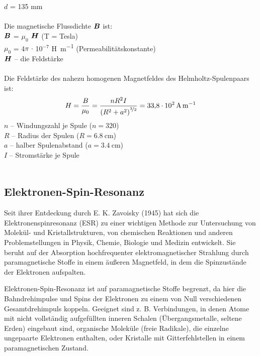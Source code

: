 \documentclass[ngerman]{scrartcl}
\begin{document}
\begin{minipage}[t]{0.6\linewidth}
    \vspace{1cm}
    $d$ = 135 mm\\ \\
    Die magnetische Flussdichte $\vb*{B}$ ist:\\
    $\vb*{B}$ = $\mu_0$ $\vb*{H}$ (T = Tesla)\\
    $\mu_0$ = 4$\pi$ $\cdot$ 10$^{-7}$ \si{\henry\per\meter} (Permeabilitätskonstante)\\
    $\vb*{H}$ -- die Feldstärke\\ \\
    Die Feldstärke des nahezu homogenen Magnetfeldes des Helmholtz-Spulenpaars ist: \\
    \begin{equation}
        {H} = \frac{{B}}{\mu_0} = \frac{n R^2 I}{\left(R^2 + a^2\right)^{\nicefrac{3}{2}}} = \SI{33.8e2}{\ampere\per\meter}
    \end{equation}
    $n$ -- Windungszahl je Spule ($n = 320$)\\
    $R$ -- Radius der Spulen ($R = \SI{6.8}{\centi\meter}$)\\
    $a$ -- halber Spulenabstand ($a = \SI{3.4}{\centi\meter}$)\\
    $I$ -- Stromstärke je Spule\\ \\
\end{minipage}
\setcaphanging


\subsection[Elektronen-Spin-Resonanz]{Elektronen-Spin-Resonanz \cite{ref:angabe_esr}}
\label{subsec:grundlagen_elektronenspinresonanz}
%
Seit ihrer Entdeckung durch E. K. Zavoisky (1945) hat sich die Elektronenspinresonanz (ESR) zu einer wichtigen Methode zur Untersuchung von Molekül- und Kristallstrukturen, von chemischen Reaktionen und anderen Problemstellungen in Physik, Chemie, Biologie und Medizin entwickelt. Sie beruht auf der Absorption hochfrequenter elektromagnetischer Strahlung durch paramagnetische Stoffe in einem äußeren Magnetfeld, in dem die Spinzustände der Elektronen aufspalten.

Elektronen-Spin-Resonanz ist auf paramagnetische Stoffe begrenzt, da hier die Bahndrehimpulse und Spins der Elektronen zu einem von Null verschiedenen Gesamtdrehimpuls koppeln. Geeignet sind z. B. Verbindungen, in denen Atome mit nicht vollständig aufgefüllten inneren Schalen (Übergangsmetalle, seltene Erden) eingebaut sind, organische Moleküle (freie Radikale), die einzelne ungepaarte Elektronen enthalten, oder Kristalle mit Gitterfehlstellen in einem paramagnetischen Zustand.
\end{document}
